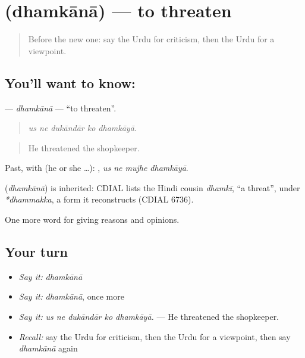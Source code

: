 \section[\texorpdfstring{\ur{دھمکانا} (dhamkānā)}{دھمکانا (dhamkānā)}]{ (dhamkānā) — to threaten}

\label{lesson:UR-C348-dhamkana}



\begin{quote}
Before the new one: say the Urdu for criticism, then the Urdu for a viewpoint.
\end{quote}

\subsection*{You'll want to know: }
\textbf{} — \emph{dhamkānā} — \textquotedblleft{}to threaten\textquotedblright{}.

\begin{quote}
    
\end{quote}

\begin{quote}
\emph{us ne dukāndār ko dhamkāyā.}
\end{quote}

\begin{quote}
He threatened the shopkeeper.
\end{quote}

Past, with  (he or she …):    , \emph{us ne mujhe dhamkāyā}.

\begin{cousinweb}
\textbf{} (\emph{dhamkānā}) is inherited: CDIAL lists the Hindi cousin \emph{dhamkī}, \textquotedblleft{}a threat\textquotedblright{}, under \emph{*dhammakka}, a form it reconstructs (CDIAL 6736).
\end{cousinweb}

\begin{grammarlens}[title={What you've built}]
One more word for giving reasons and opinions.
\end{grammarlens}

\subsection*{Your turn}
\begin{itemize}
\raggedright
  \item \emph{Say it:} \emph{dhamkānā}
  \item \emph{Say it:} \emph{dhamkānā}, once more
  \item \emph{Say it:} \emph{us ne dukāndār ko dhamkāyā.} — He threatened the shopkeeper.
  \item \emph{Recall:} say the Urdu for criticism, then the Urdu for a viewpoint, then say \emph{dhamkānā} again
\end{itemize}

